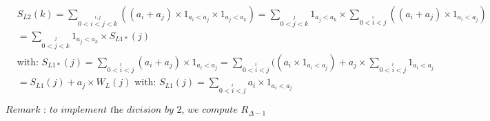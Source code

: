 \documentclass[10pt,a4paper]{letter}
\begin{document}
\begin{align*}	
	&S_{L2}(k)=\sum_{\stackrel{i,j}{0<i<j<k}}((a_{i}+a_{j})\times 1_{a_{i}<a_{j}}\times1_{a_{j}<a_{k}})
	=\sum_{\stackrel{j}{0<j<k}}1_{a_{j}<a_{k}}
	\times \sum_{\stackrel{i}{0<i<j}} ((a_{i}+a_{j})\times 1_{a_{i}<a_{j}})\\
	&=\sum_{\stackrel{j}{0<j<k}}1_{a_{j}<a_{k}} \times S_{L1*}(j)\\
	&\text{with: }
	 S_{L1*}(j)=\sum_{\stackrel{i}{0<i<j}} (a_{i}+a_{j})\times 1_{a_{i}<a_{j}}
	 = \sum_{\stackrel{i}{0<i<j}} ((a_{i}\times 1_{a_{i}<a_{j}})+a_{j}\times \sum_{\stackrel{i}{0<i<j}} 1_{a_{i}<a_{j}}\\
	 &=S_{L1}(j)+a_{j}\times W_{L}(j)\text{ with: }S_{L1}(j)=\sum_{\stackrel{i}{0<i<j}} a_{i}\times 1_{a_{i}<a_{j}}
\end{align*}

$	\textit{Remark : to implement the division by 2, we compute } R_{\Delta -1} $
\end{document}
